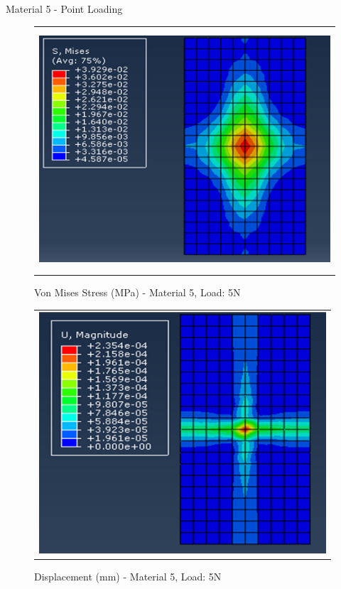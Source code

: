 \documentclass[a4paper,12pt]{article}
\numberwithin{equation}{section}
\numberwithin{figure}{section}
\begin{document}

\newpage
\noindent Material 5 - Point Loading 
\begin{figure}[H]
  \centering
  \begin{tabular}{@{}c@{}}
    \includegraphics[width=0.7\linewidth,height=255pt]{Results/Point Loading/M5_VMS_L1.png} \\
  \end{tabular}
  \caption{Von Mises Stress (MPa) - Material 5, Load: 5N}
\end{figure}

\begin{figure}[H]
  \centering
  \begin{tabular}{@{}c@{}}
    \includegraphics[width=0.7\linewidth,height=255pt]{Results/Point Loading/M5_DIS_L1.png} \\
  \end{tabular}
  \caption{Displacement (mm) - Material 5, Load: 5N}
\end{figure}
\end{document}
